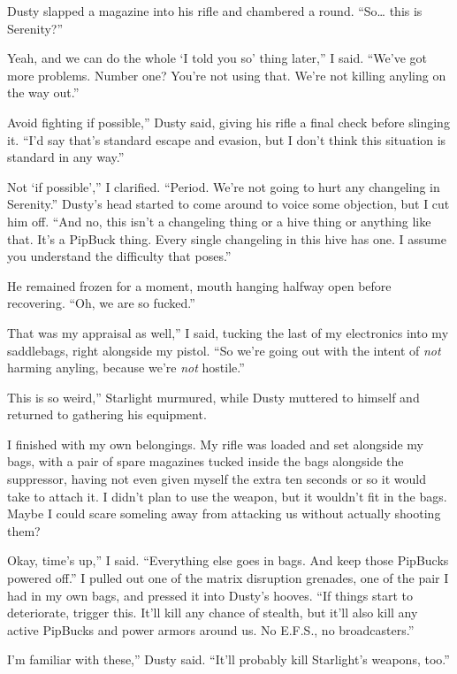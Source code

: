 Dusty slapped a magazine into his rifle and chambered a round. “So… this is Serenity?”

\leavevmode{}Yeah, and we can do the whole ‘I told you so’ thing later,” I said. “We’ve got more problems. Number one? You’re not using that. We’re not killing anyling on the way out.”

\leavevmode{}Avoid fighting if possible,” Dusty said, giving his rifle a final check before slinging it. “I’d say that’s standard escape and evasion, but I don’t think this situation is standard in any way.”

\leavevmode{}Not ‘if possible’,” I clarified. “Period. We’re not going to hurt any changeling in Serenity.” Dusty’s head started to come around to voice some objection, but I cut him off. “And no, this isn’t a changeling thing or a hive thing or anything like that. It’s a PipBuck thing. Every single changeling in this hive has one. I assume you understand the difficulty that poses.”

He remained frozen for a moment, mouth hanging halfway open before recovering. “Oh, we are so fucked.”

\leavevmode{}That was my appraisal as well,” I said, tucking the last of my electronics into my saddlebags, right alongside my pistol. “So we’re going out with the intent of \textit{not} harming anyling, because we’re \textit{not} hostile.”

\leavevmode{}This is so weird,” Starlight murmured, while Dusty muttered to himself and returned to gathering his equipment.

I finished with my own belongings. My rifle was loaded and set alongside my bags, with a pair of spare magazines tucked inside the bags alongside the suppressor, having not even given myself the extra ten seconds or so it would take to attach it. I didn’t plan to use the weapon, but it wouldn’t fit in the bags. Maybe I could scare someling away from attacking us without actually shooting them?

\leavevmode{}Okay, time’s up,” I said. “Everything else goes in bags. And keep those PipBucks powered off.” I pulled out one of the matrix disruption grenades, one of the pair I had in my own bags, and pressed it into Dusty’s hooves. “If things start to deteriorate, trigger this. It’ll kill any chance of stealth, but it’ll also kill any active PipBucks and power armors around us. No E.F.S., no broadcasters.”

\leavevmode{}I’m familiar with these,” Dusty said. “It’ll probably kill Starlight’s weapons, too.”

